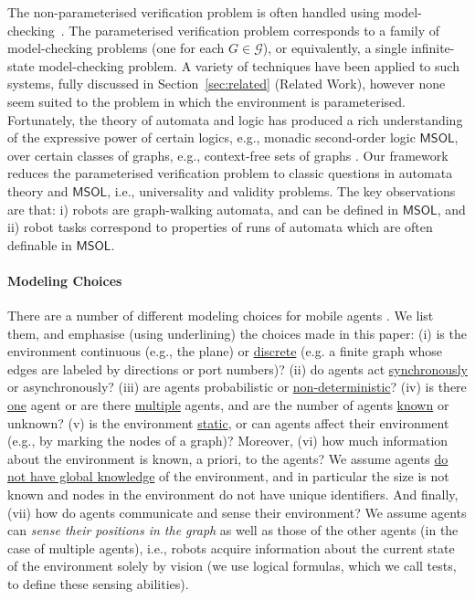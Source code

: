 \documentclass{aamas2015}
\def\gclass{\mathcal{G}}
\def\msol{\mathsf{MSOL}}
\begin{document}
The non-parameterised verification problem is often handled using model-checking~\cite{CGP1999}.  The parameterised verification problem corresponds to a family of model-checking problems (one for each $G \in \gclass$), or equivalently, a single infinite-state model-checking problem. A variety of techniques have been applied to such systems, fully discussed in Section~\ref{sec:related} (Related Work), 
however none seem suited to the problem in which the environment is parameterised.
Fortunately, the theory of automata and logic has produced a rich understanding of the expressive power of certain logics, e.g., monadic second-order logic $\msol$, over certain classes of graphs, e.g., context-free sets of graphs \cite{Thomas90, Thomas96, ALG01, CE12}. Our framework reduces the parameterised verification problem to classic questions in automata theory and $\msol$, i.e., universality and validity problems. The key observations are that: i) robots are graph-walking automata, and can be defined in $\msol$, and ii) robot tasks correspond to properties of runs of automata which are often definable in $\msol$.

\paragraph{Modeling Choices} \label{modeling}There are a number of different modeling choices for mobile agents \cite{Pelc11}. We list them, and emphasise (using underlining) the choices made in this paper: (i) is the environment continuous (e.g., the plane) or \underline{discrete} (e.g. a finite graph whose edges are labeled by directions or port numbers)? (ii) do agents act \underline{synchronously} or asynchronously? (iii) are agents probabilistic or \underline{non-deterministic}? (iv) is there \underline{one} agent or are there \underline{multiple} agents, and are the number of agents \underline{known} or unknown? (v) is the environment \underline{static}, or can agents affect their environment (e.g., by marking the nodes of a graph)? Moreover, (vi) how much information about the environment is known, a priori, to the agents?  We assume agents \underline{do not have global knowledge} of the environment, and in particular the size is not known and nodes in the environment do not have unique identifiers. And finally, (vii) how do agents communicate and sense their environment? We assume agents can {\em sense their positions in the graph} as well as those of the other agents (in the case of multiple agents), i.e., robots acquire information about the current state of the environment solely by vision (we use logical formulas, which we call tests, to define these sensing abilities). 
\end{document}
